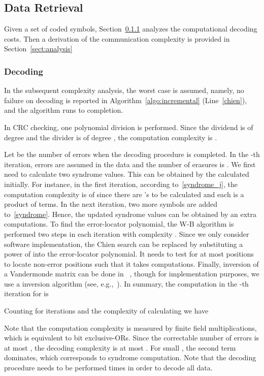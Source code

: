 \documentclass[10pt,journal,letterpaper,compsoc]{IEEEtran}
\newcommand{\0}{{\bf 0}}
\newcounter{step}
\begin{document}
\subsection{Data Retrieval}
\label{sect:retrieve}
Given a set of coded symbols, Section~\ref{sect:decoding_complexity}
analyzes the computational decoding costs. Then a derivation of the 
communication complexity is provided in Section~\ref{sect:analysis}
\subsubsection{Decoding}
\label{sect:decoding_complexity}
In the subsequent complexity analysis, the worst case is assumed, namely, no
failure on decoding is reported in Algorithm~\ref{algo:incremental}
(Line~\ref{chien}), and the algorithm runs to completion.

In CRC checking, one polynomial division is performed. Since the dividend is of
degree  and the divider is of degree , the computation complexity is .

Let  be the number of errors when the decoding procedure is completed.
In the -th iteration,  errors are assumed in the data and the
number of erasures is . We first need to calculate two
syndrome values. This can be obtained by the  calculated initially. For instance, in the first iteration, according to~\eqref{syndrome_j}, the
computation complexity is of  since there are  's to be calculated and each is a product of  terms. In the next iteration, two more symbols are
added to~\eqref{syndrome}. Hence, the updated syndrome values can be obtained by an extra
 computations. To find the error-locator polynomial, the W-B
algorithm is performed two steps in each iteration with complexity .
Since we only consider software implementation,  the Chien search can be
replaced by substituting a power of  into the error-locator polynomial.
It needs to test for at most  positions to locate  non-error
positions such that it takes  computations. Finally, inversion
of a Vandermonde matrix  can be done in ~\cite{GOH94}, though for implementation purposes,
we use a  inversion algorithm (see, e.g.,~\cite{william1988numerical}).
In
summary, the computation in the -th iteration for  is

Counting for  iterations and the complexity of calculating  we have

Note that the computation complexity is measured by finite field multiplications,
which is  equivalent to  bit exclusive-ORs.  Since the correctable number
of errors  is at most , the decoding complexity is at most
. For small , 
the second term  dominates, which corresponds to syndrome computation. 
Note that the decoding procedure needs to be performed  times in order to decode all data.
\end{document}
